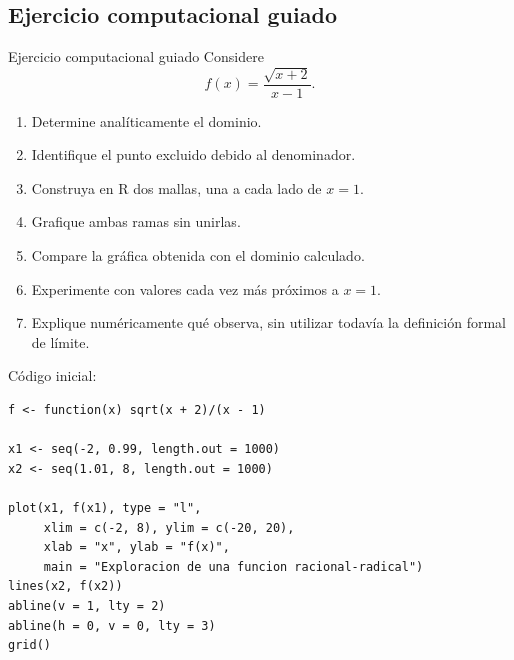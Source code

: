 \documentclass[aspectratio=169,10pt]{beamer}
\begin{document}
\subsection*{Ejercicio computacional guiado}
\begin{frame}{Ejercicio computacional guiado}
Considere
\[
f(x)=\frac{\sqrt{x+2}}{x-1}.
\]

\begin{enumerate}
    \item Determine analíticamente el dominio.
    \item Identifique el punto excluido debido al denominador.
    \item Construya en R dos mallas, una a cada lado de $x=1$.
    \item Grafique ambas ramas sin unirlas.
    \item Compare la gráfica obtenida con el dominio calculado.
    \item Experimente con valores cada vez más próximos a $x=1$.
    \item Explique numéricamente qué observa, sin utilizar todavía la definición
    formal de límite.
\end{enumerate}

Código inicial:

\begin{verbatim}
f <- function(x) sqrt(x + 2)/(x - 1)

x1 <- seq(-2, 0.99, length.out = 1000)
x2 <- seq(1.01, 8, length.out = 1000)

plot(x1, f(x1), type = "l",
     xlim = c(-2, 8), ylim = c(-20, 20),
     xlab = "x", ylab = "f(x)",
     main = "Exploracion de una funcion racional-radical")
lines(x2, f(x2))
abline(v = 1, lty = 2)
abline(h = 0, v = 0, lty = 3)
grid()
\end{verbatim}
\end{frame}
\end{document}
